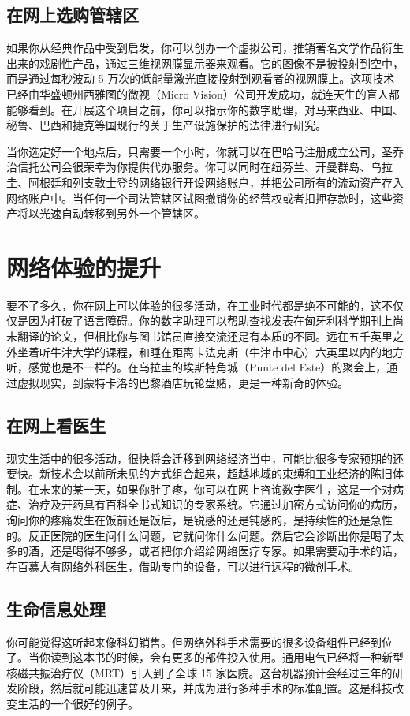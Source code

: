 \subsection{在网上选购管辖区}
如果你从经典作品中受到启发，你可以创办一个虚拟公司，推销著名文学作品衍生出来的戏剧性产品，通过三维视网膜显示器来观看。它的图像不是被投射到空中，而是通过每秒波动 5 万次的低能量激光直接投射到观看者的视网膜上。这项技术已经由华盛顿州西雅图的微视（Micro Vision）公司开发成功，就连天生的盲人都能够看到。在开展这个项目之前，你可以指示你的数字助理，对马来西亚、中国、秘鲁、巴西和捷克等国现行的关于生产设施保护的法律进行研究。

当你选定好一个地点后，只需要一个小时，你就可以在巴哈马注册成立公司，圣乔治信托公司会很荣幸为你提供代办服务。你可以同时在纽芬兰、开曼群岛、乌拉圭、阿根廷和列支敦士登的网络银行开设网络账户，并把公司所有的流动资产存入网络账户中。当任何一个司法管辖区试图撤销你的经营权或者扣押存款时，这些资产将以光速自动转移到另外一个管辖区。

\section{网络体验的提升}
要不了多久，你在网上可以体验的很多活动，在工业时代都是绝不可能的，这不仅仅是因为打破了语言障碍。你的数字助理可以帮助查找发表在匈牙利科学期刊上尚未翻译的论文，但相比你与图书馆员直接交流还是有本质的不同。远在五千英里之外坐着听牛津大学的课程，和睡在距离卡法克斯（牛津市中心）六英里以内的地方听，感觉也是不一样的。在乌拉圭的埃斯特角城（Punte del Este）的聚会上，通过虚拟现实，到蒙特卡洛的巴黎酒店玩轮盘赌，更是一种新奇的体验。

\subsection{在网上看医生}
现实生活中的很多活动，很快将会迁移到网络经济当中，可能比很多专家预期的还要快。新技术会以前所未见的方式组合起来，超越地域的束缚和工业经济的陈旧体制。在未来的某一天，如果你肚子疼，你可以在网上咨询数字医生，这是一个对病症、治疗及开药具有百科全书式知识的专家系统。它通过加密方式访问你的病历，询问你的疼痛发生在饭前还是饭后，是锐感的还是钝感的，是持续性的还是急性的。反正医院的医生问什么问题，它就问你什么问题。然后它会诊断出你是喝了太多的酒，还是喝得不够多，或者把你介绍给网络医疗专家。如果需要动手术的话，在百慕大有网络外科医生，借助专门的设备，可以进行远程的微创手术。

\subsection{生命信息处理}
你可能觉得这听起来像科幻销售。但网络外科手术需要的很多设备组件已经到位了。当你读到这本书的时候，会有更多的部件投入使用。通用电气已经将一种新型核磁共振治疗仪（MRT）引入到了全球 15 家医院。这台机器预计会经过三年的研发阶段，然后就可能迅速普及开来，并成为进行多种手术的标准配置。这是科技改变生活的一个很好的例子。

